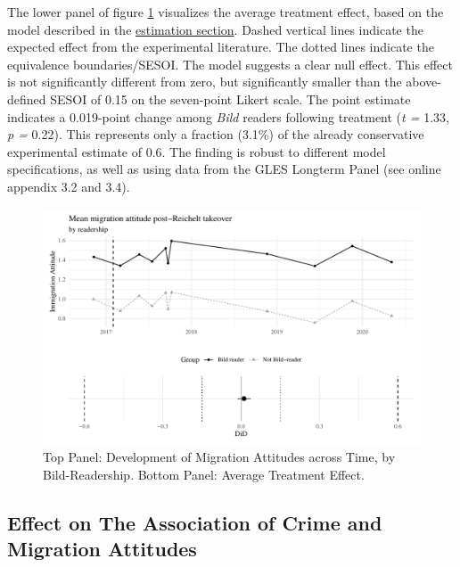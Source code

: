 \documentclass[
  12pt,
]{article}
\begin{document}
The lower panel of figure \ref{fig:singleplot} visualizes the average treatment effect, based on the model described in the \protect\hyperlink{estimation}{estimation section}. Dashed vertical lines indicate the expected effect from the experimental literature. The dotted lines indicate the equivalence boundaries/SESOI. The model suggests a clear null effect. This effect is not significantly different from zero, but significantly smaller than the above-defined SESOI of 0.15 on the seven-point Likert scale. The point estimate indicates a 0.019-point change among \emph{Bild} readers following treatment (\emph{t =} 1.33, \emph{p =} 0.22). This represents only a fraction (3.1\%) of the already conservative experimental estimate of 0.6. The finding is robust to different model specifications, as well as using data from the GLES Longterm Panel (see online appendix 3.2 and 3.4).

\begin{figure}[!ht]

{\centering \includegraphics{Manuscript_Framing_files/figure-latex/singleplot-1} 

}

\caption{Top Panel: Development of Migration Attitudes across Time, by Bild-Readership. Bottom Panel: Average Treatment Effect.}\label{fig:singleplot}
\end{figure}

\hypertarget{effect-on-the-association-of-crime-and-migration-attitudes}{%
\subsection{Effect on The Association of Crime and Migration Attitudes}\label{effect-on-the-association-of-crime-and-migration-attitudes}}
\end{document}
